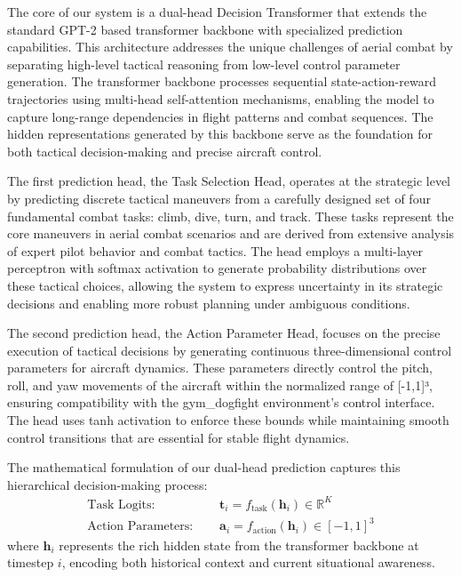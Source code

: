 \documentclass[12pt]{article}
\begin{document}
The core of our system is a dual-head Decision Transformer that extends the standard GPT-2 based transformer backbone with specialized prediction capabilities. This architecture addresses the unique challenges of aerial combat by separating high-level tactical reasoning from low-level control parameter generation. The transformer backbone processes sequential state-action-reward trajectories using multi-head self-attention mechanisms, enabling the model to capture long-range dependencies in flight patterns and combat sequences. The hidden representations generated by this backbone serve as the foundation for both tactical decision-making and precise aircraft control.

The first prediction head, the Task Selection Head, operates at the strategic level by predicting discrete tactical maneuvers from a carefully designed set of four fundamental combat tasks: climb, dive, turn, and track. These tasks represent the core maneuvers in aerial combat scenarios and are derived from extensive analysis of expert pilot behavior and combat tactics. The head employs a multi-layer perceptron with softmax activation to generate probability distributions over these tactical choices, allowing the system to express uncertainty in its strategic decisions and enabling more robust planning under ambiguous conditions.

The second prediction head, the Action Parameter Head, focuses on the precise execution of tactical decisions by generating continuous three-dimensional control parameters for aircraft dynamics. These parameters directly control the pitch, roll, and yaw movements of the aircraft within the normalized range of [-1,1]³, ensuring compatibility with the gym_dogfight environment's control interface. The head uses tanh activation to enforce these bounds while maintaining smooth control transitions that are essential for stable flight dynamics.

The mathematical formulation of our dual-head prediction captures this hierarchical decision-making process:
\begin{align}
\text{Task Logits: } &\quad \mathbf{t}_i = f_{\text{task}}(\mathbf{h}_i) \in \mathbb{R}^K \\
\text{Action Parameters: } &\quad \mathbf{a}_i = f_{\text{action}}(\mathbf{h}_i) \in [-1,1]^3
\end{align}
where $\mathbf{h}_i$ represents the rich hidden state from the transformer backbone at timestep $i$, encoding both historical context and current situational awareness.
\end{document}
